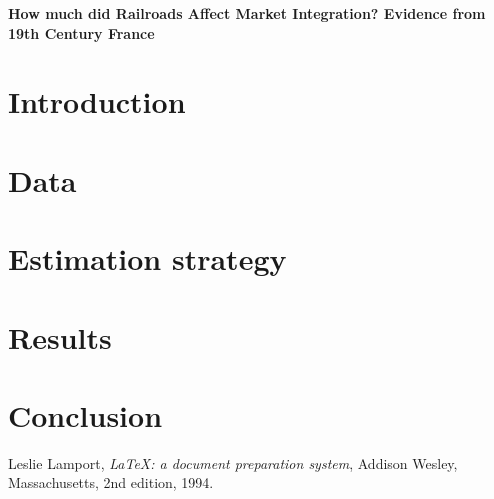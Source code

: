 \documentclass[12pt,twoside]{article}
\begin{document}
\begin{centering}
\textbf{How much did Railroads Affect Market Integration? Evidence from 19th Century France}
\end{centering}

\section{Introduction}

\section{Data}

\section{Estimation strategy}



\section{Results}

\section{Conclusion}

\newpage
\begin{thebibliography}{9}

  Leslie Lamport,
  \emph{\LaTeX: a document preparation system},
  Addison Wesley, Massachusetts,
  2nd edition,
  1994.

\end{thebibliography}
\end{document}
